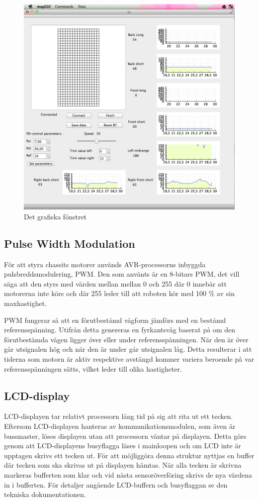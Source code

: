 \documentclass[a4paper,12pt,fleqn]{article}
\begin{document}
\begin{figure}[htp] %
  \begin{center}
  \includegraphics[keepaspectratio=true,width=0.5\linewidth]{gui.png}  %
  \end{center}
  \caption{Det grafiska fönstret} %
  \label{fig:gui}
\end{figure}

\subsection{Pulse Width Modulation}

För att styra chassits motorer används AVR-processorns inbyggda pulsbreddsmodulering, PWM. Den som använts är en 8-bitars PWM, det vill säga att den styrs med värden mellan mellan 0 och 255 där 0 innebär att motorerna inte körs och där 255 leder till att roboten kör med 100 \% av sin maxhastighet.

PWM fungerar så att en förutbestämd vågform jämförs med en bestämd referensspänning. Utifrån detta genereras en fyrkantsvåg baserat på om den förutbestämda vågen ligger över eller under referensspänningen. När den är över går utsignalen hög och när den är under går utsignalen låg. Detta resulterar i att tiderna som motorn är aktiv respektive avstängd kommer variera beroende på var referensspänningen sätts, vilket leder till olika hastigheter.


\subsection{LCD-display}
LCD-displayen tar relativt processorn lång tid på sig att rita ut ett tecken. Eftersom LCD-displayen hanteras av kommunikationsmodulen, som även är bussmaster, löses displayen utan att processorn väntar på displayen. Detta görs genom att LCD-displayens busyflagga läses i mainloopen och om LCD inte är upptagen skrivs ett tecken ut. För att möjliggöra denna struktur nyttjas en buffer där tecken som ska skrivas ut på displayen hämtas. När alla tecken är skrivna markeras bufferten som klar och vid nästa sensoröverföring skrivs de nya värdena in i bufferten. För detaljer angående LCD-buffern och busyflaggan se den tekniska dokumentationen.
\end{document}

